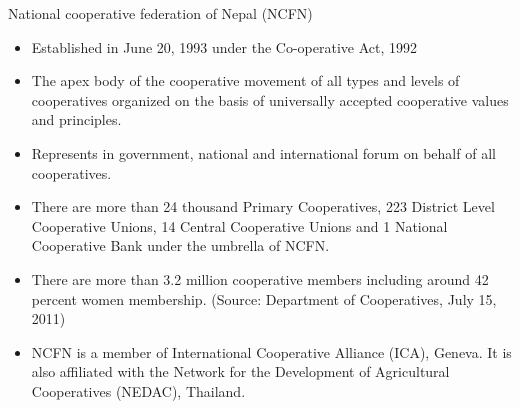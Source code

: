 \documentclass[12pt,ignorenonframetext,aspectratio=169]{beamer}
\providecommand{\tightlist}{%
  \setlength{\itemsep}{0pt}\setlength{\parskip}{0pt}}
\begin{document}
\begin{frame}{National cooperative federation of Nepal (NCFN)}
\protect\hypertarget{national-cooperative-federation-of-nepal-ncfn}{}
\begin{itemize}
\tightlist
\item
  Established in June 20, 1993 under the Co-operative Act, 1992
\item
  The apex body of the cooperative movement of all types and levels of
  cooperatives organized on the basis of universally accepted
  cooperative values and principles.
\item
  Represents in government, national and international forum on behalf
  of all cooperatives.
\item
  There are more than 24 thousand Primary Cooperatives, 223 District
  Level Cooperative Unions, 14 Central Cooperative Unions and 1 National
  Cooperative Bank under the umbrella of NCFN.
\item
  There are more than 3.2 million cooperative members including around
  42 percent women membership. (Source: Department of Cooperatives, July
  15, 2011)
\item
  NCFN is a member of International Cooperative Alliance (ICA), Geneva.
  It is also affiliated with the Network for the Development of
  Agricultural Cooperatives (NEDAC), Thailand.
\end{itemize}
\end{frame}
\end{document}
